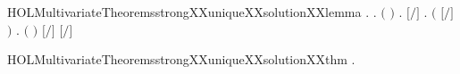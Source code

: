 \begin{SaveVerbatim}{HOLMultivariateTheoremsstrongXXuniqueXXsolutionXXlemma}
\HOLTokenTurnstile{} \HOLSymConst{\HOLTokenForall{}} .
          \HOLSymConst{\HOLTokenConj{}}   \HOLConst{\HOLTokenSubset{}}   \HOLSymConst{\HOLTokenImp{}}
       \HOLSymConst{\HOLTokenForall{}}.
           \ensuremath{(}  \HOLSymConst{\ensuremath{=}}  \ensuremath{)} \HOLSymConst{\HOLTokenImp{}}
           \HOLSymConst{\HOLTokenForall{}} .
               \ensuremath{[}\ensuremath{/}\ensuremath{]}  \HOLTokenTransBegin{}\HOLTokenTransEnd {} \HOLSymConst{\HOLTokenImp{}}
               \HOLSymConst{\HOLTokenExists{}}.
                      \HOLSymConst{\HOLTokenConj{}}   \HOLConst{\HOLTokenSubset{}}   \HOLSymConst{\HOLTokenConj{}}
                   \ensuremath{(} \HOLSymConst{\ensuremath{=}} \ensuremath{[}\ensuremath{/}\ensuremath{]} \ensuremath{)} \HOLSymConst{\HOLTokenConj{}}
                   \HOLSymConst{\HOLTokenForall{}}.
                       \ensuremath{(}  \HOLSymConst{\ensuremath{=}}  \ensuremath{)} \HOLSymConst{\HOLTokenImp{}}
                       \ensuremath{[}\ensuremath{/}\ensuremath{]}  \HOLTokenTransBegin{}\HOLTokenTransEnd \ensuremath{[}\ensuremath{/}\ensuremath{]} 
\end{SaveVerbatim}
\newcommand{\HOLMultivariateTheoremsstrongXXuniqueXXsolutionXXlemma}{\UseVerbatim{HOLMultivariateTheoremsstrongXXuniqueXXsolutionXXlemma}}
\begin{SaveVerbatim}{HOLMultivariateTheoremsstrongXXuniqueXXsolutionXXthm}
\HOLTokenTurnstile{} \HOLSymConst{\HOLTokenForall{}}   .
          \HOLSymConst{\HOLTokenConj{}}    \HOLSymConst{\HOLTokenConj{}}
        \HOLConst{\HOLTokenIn{}}     \HOLSymConst{\HOLTokenConj{}}
        \HOLConst{\HOLTokenIn{}}     \HOLSymConst{\HOLTokenImp{}}
         
\end{SaveVerbatim}

